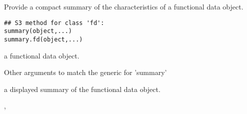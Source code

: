\begin{Description}\relax
Provide a compact summary of the characteristics of a functional
data object.
\end{Description}
\begin{Usage}
\begin{verbatim}
## S3 method for class 'fd':
summary(object,...)
summary.fd(object,...)
\end{verbatim}
\end{Usage}
\begin{Arguments}
\begin{ldescription}
\item[\code{object}] a functional data object.

\item[\code{...}] Other arguments to match the generic for 'summary'
\end{ldescription}
\end{Arguments}
\begin{Value}
a displayed summary of the functional data object.
\end{Value}
\begin{SeeAlso}\relax
{},
\end{SeeAlso}

